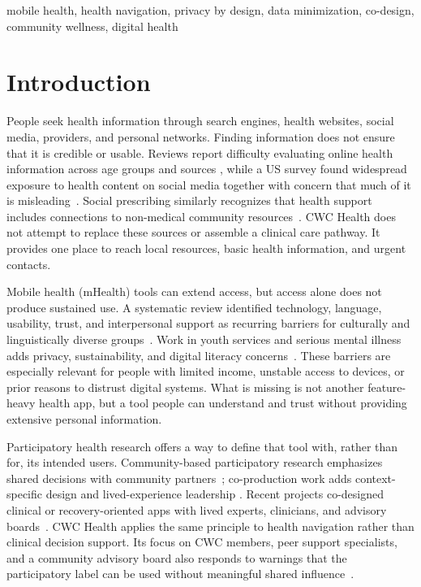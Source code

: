 \documentclass[conference,a4paper]{IEEEtran}
\begin{document}
\begin{IEEEkeywords}
mobile health, health navigation, privacy by design, data minimization,
co-design, community wellness, digital health
\end{IEEEkeywords}

\section{Introduction}
People seek health information through search engines, health websites, social
media, providers, and personal networks. Finding information does not ensure that
it is credible or usable. Reviews report difficulty evaluating online health
information across age groups and sources
\cite{Jia2021OHIS,DiazHernandez2024HealthInfo,Zhao2022OlderOHIS}, while a US
survey found widespread exposure to health content on social media together with
concern that much of it is misleading~\cite{Pedroso2026SocialMedia}. Social
prescribing similarly recognizes that health support includes connections to
non-medical community resources~\cite{Lancet2025SocialPrescribing}. CWC Health
does not attempt to replace these sources or assemble a clinical care pathway.
It provides one place to reach local resources, basic health information, and
urgent contacts.

Mobile health (mHealth) tools can extend access, but access alone does not produce
sustained use. A systematic review identified technology, language, usability,
trust, and interpersonal support as recurring barriers for culturally and
linguistically diverse groups~\cite{Whitehead2023Barriers}. Work in youth
services and serious mental illness adds privacy, sustainability, and digital
literacy concerns~\cite{Ding2025mHealth,Dwyer2025TechUse}. These barriers are
especially relevant for people with limited income, unstable access to devices,
or prior reasons to distrust digital systems. What is missing is not another
feature-heavy health app, but a tool people can understand and trust without
providing extensive personal information.

Participatory health research offers a way to define that tool with, rather than
for, its intended users. Community-based participatory research emphasizes shared
decisions with community partners~\cite{Opara2025CBPR}; co-production work adds
context-specific design and lived-experience leadership
\cite{PapastavrouBrooks2023Principles,Epp2025CoLeadership}. Recent projects
co-designed clinical or recovery-oriented apps with lived experts, clinicians,
and advisory boards~\cite{Darcey2024A4iO,Deshais2026WECM}. CWC Health applies
the same principle to health navigation rather than clinical decision support.
Its focus on CWC members, peer support specialists, and a community advisory
board also responds to warnings that the participatory label can be used without
meaningful shared influence~\cite{Veldmeijer2025Participatory}.
\end{document}
